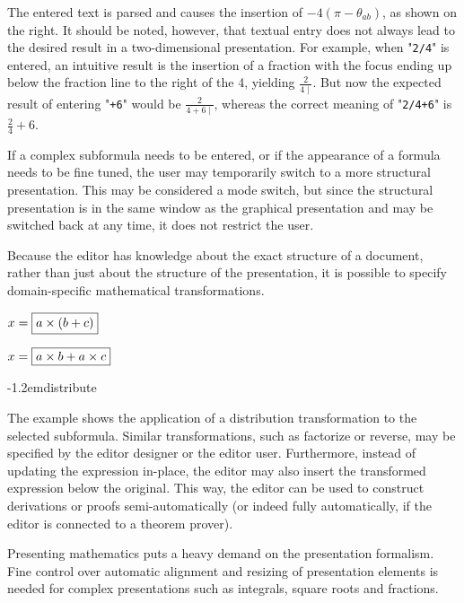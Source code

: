\documentclass{speauth}
\begin{document}
The entered text is parsed and causes the insertion of $- 4(\pi - \theta_{ab})$, as shown on the right.  It should be noted, however, that textual entry does not always lead to the desired result in a two-dimensional presentation. For example, when "\verb|2/4|" is entered, an intuitive result is the insertion of a fraction with the focus ending up below the fraction line to the right of the 4, yielding {$\frac{2}{4\mid}$}. But now the expected result of entering "\verb|+6|" would be {$\frac{2}{4+6\mid}$}, whereas the correct meaning of "\verb|2/4+6|" is $\frac{2}{4}+6$.

If a complex subformula needs to be entered, or if the appearance of a formula needs to be fine tuned, the user may temporarily switch to a more structural presentation. This may be considered a mode switch, but since the structural presentation is in the same window as the graphical presentation and may be switched back at any time, it does not restrict the user.


Because the editor has knowledge about the exact structure of a document, rather than just about the structure of the presentation, it is possible to specify domain-specific mathematical transformations.

\editStepScrshot
{\begin{scriptsize}$x = \framebox{$a \times (b + c)$}$\end{scriptsize}}
{\begin{scriptsize}$x = \framebox{$a \times b + a \times c$}$\end{scriptsize}}
{-1.2em}{\small distribute}

The example shows the application of a distribution transformation to the selected subformula. Similar transformations, such as factorize or reverse, may be specified by the editor designer or the editor user. Furthermore, instead of updating the expression in-place, the editor may also insert the transformed expression below the original. This way, the editor can be used to construct derivations or proofs semi-automatically (or indeed fully automatically, if the editor is connected to a theorem prover).


Presenting mathematics puts a heavy demand on the presentation formalism. Fine control over automatic alignment and resizing of presentation elements is needed for complex presentations such as integrals, square roots and fractions. 
\end{document}
